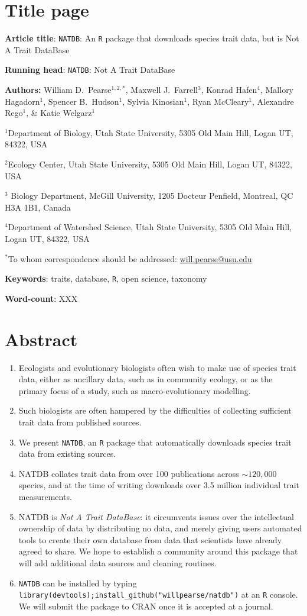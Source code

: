 \documentclass[12pt]{report}
\newcommand{\R}{\texttt{R}\xspace}
\newcommand{\natdb}{\texttt{NATDB}\xspace}
\begin{document}
\section*{Title page}
\textbf{Article title}: \natdb : An \R package that downloads species
trait data, but is Not A Trait DataBase

\textbf{Running head}: \natdb: Not A Trait DataBase

\textbf{Authors:} William D.\ Pearse$^{1,2,*}$, Maxwell J.\
Farrell$^3$, Konrad Hafen$^4$, Mallory Hagadorn$^1$, Spencer B.\
Hudson$^1$, Sylvia Kinosian$^1$, Ryan McCleary$^1$, Alexandre
Rego$^1$, \& Katie Welgarz$^1$

$^1$Department of Biology, Utah State University, 5305 Old Main Hill,
Logan UT, 84322, USA

$^2$Ecology Center, Utah State University, 5305 Old Main Hill, Logan
UT, 84322, USA

$^3$ Biology Department, McGill University, 1205 Docteur Penfield,
Montreal, QC H3A 1B1, Canada

$^4$Department of Watershed Science, Utah State University, 5305 Old
Main Hill, Logan UT, 84322, USA

$^*$To whom correspondence should be addressed:
\url{will.pearse@usu.edu}

\textbf{Keywords}: traits, database, \R, open science, taxonomy

\textbf{Word-count}: XXX

\clearpage
\section{Abstract}
\begin{enumerate}
\item Ecologists and evolutionary biologists often wish to make use of
  species trait data, either as ancillary data, such as in community
  ecology, or as the primary focus of a study, such as
  macro-evolutionary modelling.
\item Such biologists are often hampered by the difficulties of
  collecting sufficient trait data from published sources.
\item We present \natdb, an \R package that automatically downloads
  species trait data from existing sources.
\item NATDB collates trait data from over 100 publications across
  $\mathtt{\sim}120,000$ species, and at the time of writing downloads
  over 3.5 million individual trait measurements.
\item NATDB is \emph{Not A Trait DataBase}: it circumvents issues over
  the intellectual ownership of data by distributing no data, and
  merely giving users automated tools to create their own database
  from data that scientists have already agreed to share. We hope to
  establish a community around this package that will add additional
  data sources and cleaning routines.
\item \natdb can be installed by typing
  \texttt{library(devtools);install\_github("willpearse/natdb")} at an
  \R console. We will submit the package to CRAN once it is accepted
  at a journal.
\end{enumerate}
\end{document}
